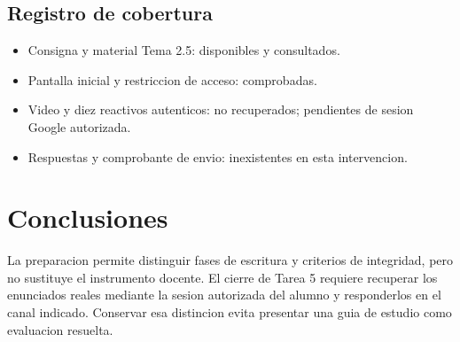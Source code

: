 {\subsection{Registro de cobertura}
\begin{itemize}
\item Consigna y material Tema 2.5: disponibles y consultados.
\item Pantalla inicial y restriccion de acceso: comprobadas.
\item Video y diez reactivos autenticos: no recuperados; pendientes de sesion Google autorizada.
\item Respuestas y comprobante de envio: inexistentes en esta intervencion.
\end{itemize}
\section{Conclusiones}
La preparacion permite distinguir fases de escritura y criterios de integridad, pero no sustituye el instrumento docente. El cierre de Tarea 5 requiere recuperar los enunciados reales mediante la sesion autorizada del alumno y responderlos en el canal indicado. Conservar esa distincion evita presentar una guia de estudio como evaluacion resuelta.
}
\def\seminarioreferencias{\clearpage\section*{Referencias}
Instituto Tecnologico Superior de Cajeme. (s. f.). \emph{Proceso de redaccion academica en el posgrado} [Material didactico, Tema 2.5]. \url{https://cursos3.e-itesca.edu.mx/mod/assign/view.php?id=2888}\par\medskip
Instituto Tecnologico Superior de Cajeme. (s. f.). \emph{Tarea 5. Proceso de redaccion academica} [Formulario]. \url{https://forms.gle/yg9trSm9ac1XAC439}
}
